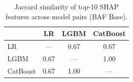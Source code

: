 \begin{table}[ht!]
\centering
\caption{Jaccard similarity of top-10 SHAP features across model pairs (BAF Base).}
\label{tab:shap_consistency}
\begin{tabular}{l c c c}
\toprule
          & LR & LGBM & CatBoost \\
\midrule
LR         & --- & 0.67 & 0.67 \\
LGBM       & 0.67 & --- & 1.00 \\
CatBoost   & 0.67 & 1.00 & --- \\
\bottomrule
\end{tabular}
\end{table}